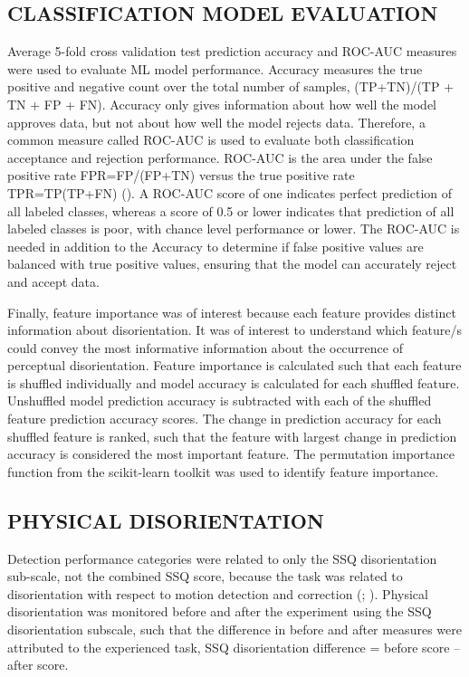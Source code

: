 \documentclass[11pt, onecolumn]{article}
\begin{document}
\subsection{CLASSIFICATION MODEL EVALUATION}
Average 5-fold cross validation test prediction accuracy and ROC-AUC measures were used to evaluate ML model performance.  Accuracy measures the true positive and negative count over the total number of samples, (TP+TN)/(TP + TN + FP + FN).  Accuracy only gives information about how well the model approves data, but not about how well the model rejects data.  Therefore, a common measure called ROC-AUC is used to evaluate both classification acceptance and rejection performance.  ROC-AUC is the area under the false positive rate FPR=FP/(FP+TN) versus the true positive rate TPR=TP(TP+FN) (\cite{Burkov_2019_ML}).  A ROC-AUC score of one indicates perfect prediction of all labeled classes, whereas a score of 0.5 or lower indicates that prediction of all labeled classes is poor, with chance level performance or lower.  The ROC-AUC is needed in addition to the Accuracy to determine if false positive values are balanced with true positive values, ensuring that the model can accurately reject and accept data.

Finally, feature importance was of interest because each feature provides distinct information about disorientation.  It was of interest to understand which feature/s could convey the most informative information about the occurrence of perceptual disorientation.  Feature importance is calculated such that each feature is shuffled individually and model accuracy is calculated for each shuffled feature.  Unshuffled model prediction accuracy is subtracted with each of the shuffled feature prediction accuracy scores. The change in prediction accuracy for each shuffled feature is ranked, such that the feature with largest change in prediction accuracy is considered the most important feature.  The permutation importance function from the scikit-learn toolkit was used to identify feature importance.

\subsection{PHYSICAL DISORIENTATION}
Detection performance categories were related to only the SSQ disorientation sub-scale, not the combined SSQ score, because the task was related to disorientation with respect to motion detection and correction (\cite{Kennedy_1993_Simulator}; \cite{Bouchard_2007_SimulatorSickness}).  Physical disorientation was monitored before and after the experiment using the SSQ disorientation subscale, such that the difference in before and after measures were attributed to the experienced task,
SSQ disorientation difference = before score – after score.
\end{document}
